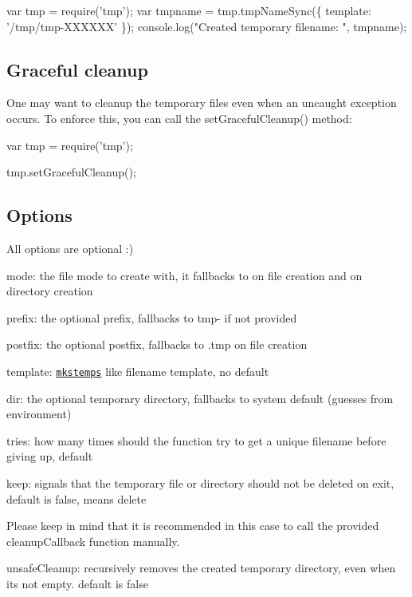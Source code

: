 \begin{DoxyCode}
var tmp = require('tmp');
var tmpname = tmp.tmpNameSync(\{ template: '/tmp/tmp-XXXXXX' \});
console.log("Created temporary filename: ", tmpname);
\end{DoxyCode}


\subsection*{Graceful cleanup}

One may want to cleanup the temporary files even when an uncaught exception occurs. To enforce this, you can call the {\ttfamily set\+Graceful\+Cleanup()} method\+:


\begin{DoxyCode}
var tmp = require('tmp');

tmp.setGracefulCleanup();
\end{DoxyCode}


\subsection*{Options}

All options are optional \+:)


\begin{DoxyItemize}
\item {\ttfamily mode}\+: the file mode to create with, it fallbacks to {} on file creation and {} on directory creation
\item {\ttfamily prefix}\+: the optional prefix, fallbacks to {\ttfamily tmp-\/} if not provided
\item {\ttfamily postfix}\+: the optional postfix, fallbacks to {\ttfamily .tmp} on file creation
\item {\ttfamily template}\+: \href{http://www.kernel.org/doc/man-pages/online/pages/man3/mkstemp.3.html}{\tt {\ttfamily mkstemps}} like filename template, no default
\item {\ttfamily dir}\+: the optional temporary directory, fallbacks to system default (guesses from environment)
\item {\ttfamily tries}\+: how many times should the function try to get a unique filename before giving up, default {}
\item {\ttfamily keep}\+: signals that the temporary file or directory should not be deleted on exit, default is {\ttfamily false}, means delete
\begin{DoxyItemize}
\item Please keep in mind that it is recommended in this case to call the provided {\ttfamily cleanup\+Callback} function manually.
\end{DoxyItemize}
\item {\ttfamily unsafe\+Cleanup}\+: recursively removes the created temporary directory, even when it\textquotesingle{}s not empty. default is {\ttfamily false} 
\end{DoxyItemize}